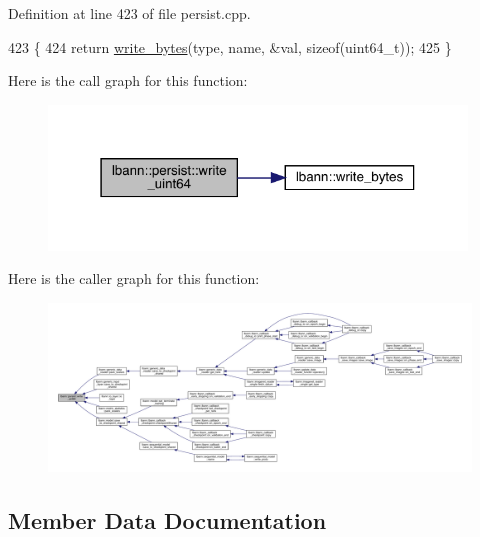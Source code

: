 Definition at line 423 of file persist.\+cpp.


\begin{DoxyCode}
423                                                                                  \{
424   \textcolor{keywordflow}{return} \hyperlink{classlbann_1_1persist_a8729c7c90f4ca3090cd678fce91a0eb0}{write\_bytes}(type, name, &val, \textcolor{keyword}{sizeof}(uint64\_t));
425 \}
\end{DoxyCode}
Here is the call graph for this function\+:\nopagebreak
\begin{figure}[H]
\begin{center}
\leavevmode
\includegraphics[width=315pt]{classlbann_1_1persist_aced95e3bc711276b072af97b65ef9fc1_cgraph}
\end{center}
\end{figure}
Here is the caller graph for this function\+:\nopagebreak
\begin{figure}[H]
\begin{center}
\leavevmode
\includegraphics[width=350pt]{classlbann_1_1persist_aced95e3bc711276b072af97b65ef9fc1_icgraph}
\end{center}
\end{figure}


\subsection{Member Data Documentation}
\mbox{\label{classlbann_1_1persist_a0bd4fd42d9858a5210c8034dfbb666d4}} 

